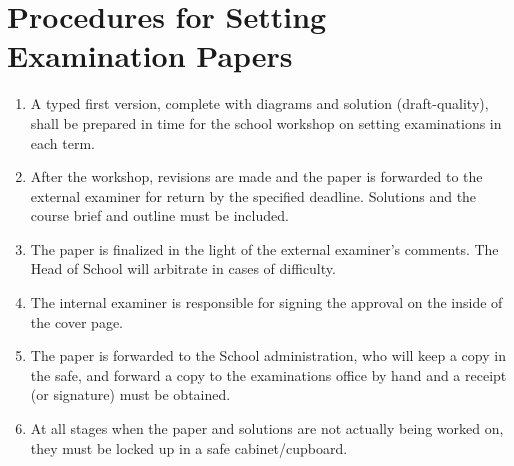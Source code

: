 \documentclass{ArcHandout}
\begin{document}
\section{Procedures for Setting Examination Papers}

\begin{enumerate}
  \item A typed first version, complete with diagrams and solution
  (draft-quality), shall be prepared in time for the school workshop on
  setting examinations in each term.

  \item After the workshop, revisions are made and the paper is forwarded
  to the external examiner for return by the specified deadline. Solutions
  and the course brief and outline must be included.

  \item The paper is finalized in the light of the external examiner's
  comments. The Head of School will arbitrate in cases of difficulty.

  \item The internal examiner is responsible for signing the approval on
  the inside of the cover page.

  \item The paper is forwarded to the School administration, who will keep
  a copy in the safe, and forward a copy to the examinations office by hand
  and a receipt (or signature) must be obtained.

  \item At all stages when the paper and solutions are not actually being
  worked on, they must be locked up in a safe cabinet/cupboard.
\end{enumerate}
\end{document}
